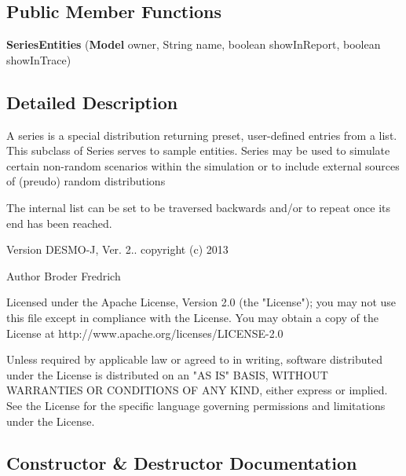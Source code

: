 \subsection*{Public Member Functions}
\begin{DoxyCompactItemize}
\item 
{\bf Series\-Entities} ({\bf Model} owner, String name, boolean show\-In\-Report, boolean show\-In\-Trace)
\end{DoxyCompactItemize}


\subsection{Detailed Description}
A series is a special distribution returning preset, user-\/defined entries from a list. This subclass of Series serves to sample entities. Series may be used to simulate certain non-\/random scenarios within the simulation or to include external sources of (preudo) random distributions

The internal list can be set to be traversed backwards and/or to repeat once its end has been reached.

\begin{DoxyVersion}{Version}
D\-E\-S\-M\-O-\/\-J, Ver. 2.. copyright (c) 2013 
\end{DoxyVersion}
\begin{DoxyAuthor}{Author}
Broder Fredrich \begin{DoxyVerb}    Licensed under the Apache License, Version 2.0 (the "License"); you
    may not use this file except in compliance with the License. You may
    obtain a copy of the License at
    http://www.apache.org/licenses/LICENSE-2.0

    Unless required by applicable law or agreed to in writing, software
    distributed under the License is distributed on an "AS IS" BASIS,
    WITHOUT WARRANTIES OR CONDITIONS OF ANY KIND, either express or
    implied. See the License for the specific language governing
    permissions and limitations under the License.\end{DoxyVerb}
 
\end{DoxyAuthor}


\subsection{Constructor \& Destructor Documentation}
